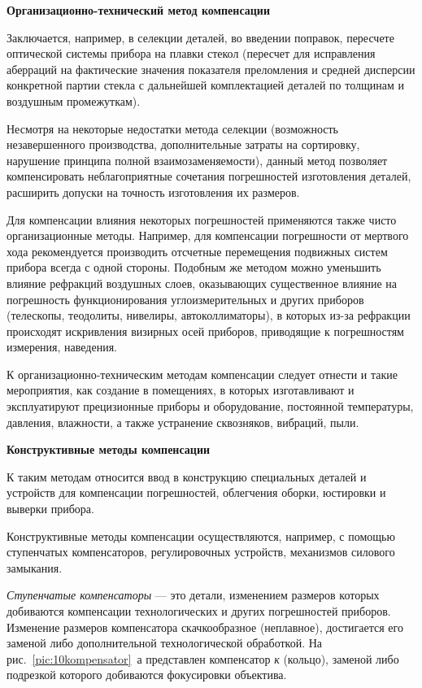 \begin{flushleft}
	\textbf{Организационно-технический метод компенсации}
\end{flushleft}

Заключается, например, в селекции деталей, во введении поправок, пересчете оптической системы прибора на плавки стекол (пересчет для исправления аберраций на фактические значения показателя преломления и средней дисперсии конкретной партии стекла с дальнейшей комплектацией деталей по толщинам и воздушным промежуткам).

Несмотря на некоторые недостатки метода селекции (возможность незавершенного производства, дополнительные затраты на сортировку, нарушение принципа полной взаимозаменяемости), данный метод позволяет компенсировать неблагоприятные сочетания погрешностей изготовления деталей, расширить допуски на точность изготовления их размеров. 

Для компенсации влияния некоторых погрешностей применяются также чисто организационные методы. Например, для компенсации погрешности от мертвого хода рекомендуется производить отсчетные перемещения подвижных систем прибора всегда с одной стороны. Подобным же методом можно уменьшить влияние рефракций воздушных слоев, оказывающих существенное влияние на погрешность функционирования углоизмерительных и других приборов (телескопы, теодолиты, нивелиры, автоколлиматоры), в которых из-за рефракции происходят искривления визирных осей приборов, приводящие к погрешностям измерения, наведения.

К организационно-техническим методам компенсации следует отнести и такие мероприятия, как создание в помещениях, в которых изготавливают и эксплуатируют прецизионные приборы и оборудование, постоянной температуры, давления, влажности, а также устранение сквозняков, вибраций, пыли.

\begin{flushleft}
	\textbf{Конструктивные методы компенсации}
\end{flushleft}

К таким методам относится ввод в конструкцию специальных деталей и устройств для компенсации погрешностей, облегчения оборки, юстировки и выверки прибора.

Конструктивные методы компенсации осуществляются, например, с помощью ступенчатых компенсаторов, регулировочных устройств, механизмов силового замыкания. 

\textit{Ступенчатые компенсаторы} --- это детали, изменением размеров которых добиваются компенсации технологических и других погрешностей приборов. Изменение размеров компенсатора скачкообразное (неплавное), достигается его заменой либо дополнительной технологической обработкой. На рис.~\ref{pic:10kompensator}~а представлен компенсатор \textit{к} (кольцо), заменой либо подрезкой которого добиваются фокусировки объектива.

